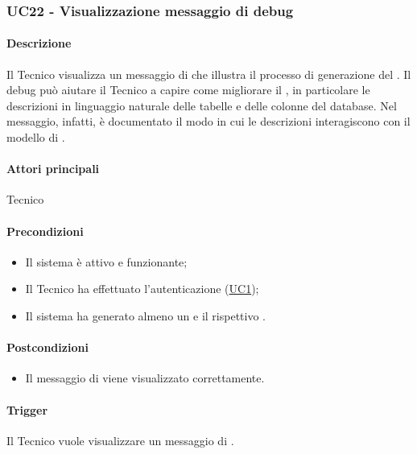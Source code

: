 \subsubsection{UC22 - Visualizzazione messaggio di debug}\label{UC22}
\paragraph*{Descrizione}
Il Tecnico visualizza un messaggio di  che illustra il processo di generazione del . Il debug può aiutare il Tecnico a capire come migliorare il , in particolare le descrizioni in linguaggio naturale delle tabelle e delle colonne del database. Nel messaggio, infatti, è documentato il modo in cui le descrizioni interagiscono con il modello di .

\paragraph*{Attori principali}
Tecnico

\paragraph*{Precondizioni}
\begin{itemize}
  \item Il sistema è attivo e funzionante;
  \item Il Tecnico ha effettuato l'autenticazione (\hyperref[UC1]{UC1});
  \item Il sistema ha generato almeno un  e il rispettivo .
\end{itemize}

\paragraph*{Postcondizioni}
\begin{itemize}
  \item Il messaggio di  viene visualizzato correttamente.
\end{itemize}

\paragraph*{Trigger}
Il Tecnico vuole visualizzare un messaggio di .

